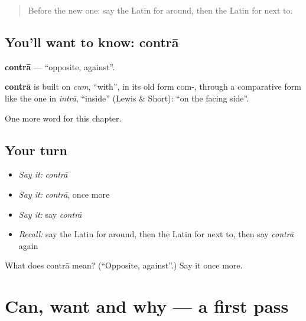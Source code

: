 \label{lesson:LA-C119-contra}



\begin{quote}
Before the new one: say the Latin for around, then the Latin for next to.
\end{quote}

\subsection*{You'll want to know: contrā}
\textbf{contrā} — \textquotedblleft{}opposite, against\textquotedblright{}.

\begin{cousinweb}
\textbf{contrā} is built on \emph{cum}, \textquotedblleft{}with\textquotedblright{}, in its old form com-, through a comparative form like the one in \emph{intrā}, \textquotedblleft{}inside\textquotedblright{} (Lewis \& Short): \textquotedblleft{}on the facing side\textquotedblright{}.
\end{cousinweb}

\begin{grammarlens}[title={What you've built}]
One more word for this chapter.
\end{grammarlens}

\subsection*{Your turn}
\begin{itemize}
\raggedright
  \item \emph{Say it:} \emph{contrā}
  \item \emph{Say it:} \emph{contrā}, once more
  \item \emph{Say it:} say \emph{contrā}
  \item \emph{Recall:} say the Latin for around, then the Latin for next to, then say \emph{contrā} again
\end{itemize}

\begin{tcolorbox}[breakable,colback=teal!4,colframe=teal!35!black,title={Before you move on}]
What does contrā mean? (\textquotedblleft{}Opposite, against\textquotedblright{}.) Say it once more.
\end{tcolorbox}
\section[(dialogue)]{Can, want and why — a first pass}

